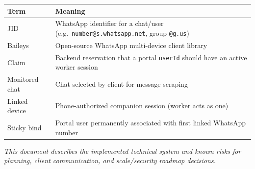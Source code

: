 \documentclass[11pt,a4paper]{article}
\begin{document}
\begin{tabularx}{\textwidth}{L{3.6cm} X}
\toprule
\textbf{Term} & \textbf{Meaning} \\
\midrule
JID & WhatsApp identifier for a chat/user (e.g.\ \texttt{number@s.whatsapp.net}, group \texttt{@g.us}) \\
Baileys & Open-source WhatsApp multi-device client library \\
Claim & Backend reservation that a portal \texttt{userId} should have an active worker session \\
Monitored chat & Chat selected by client for message scraping \\
Linked device & Phone-authorized companion session (worker acts as one) \\
Sticky bind & Portal user permanently associated with first linked WhatsApp number \\
\bottomrule
\end{tabularx}

\vspace{1.2cm}
{\small\textit{This document describes the implemented technical system and known risks for planning, client communication, and scale/security roadmap decisions.}}
\end{document}
